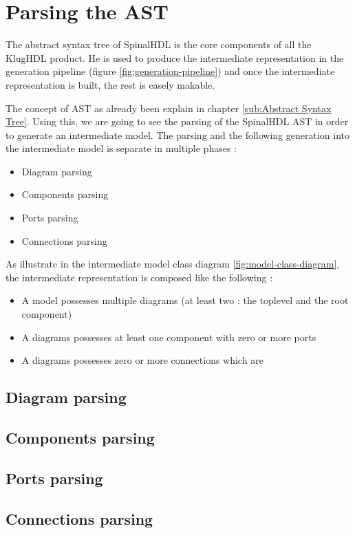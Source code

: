 \chapter{Parsing the AST}
\label{chap:parsing-ast}

The abstract syntax tree of SpinalHDL is the core components of all the KlugHDL
product. He is used to produce the intermediate representation in the generation
pipeline (figure \ref{fig:generation-pipeline}) and once the intermediate
representation is built, the rest is easely makable.

The concept of AST as already been explain in chapter \ref{sub:Abstract Syntax
  Tree}. Using this, we are going to see the parsing of the SpinalHDL AST in
order to generate an intermediate model. The parsing and the following
generation into the intermediate model is separate in multiple
phases :

\begin{itemize}
\item Diagram parsing
\item Components parsing
\item Ports parsing
\item Connections parsing
\end{itemize}

As illustrate in the intermediate model class diagram
\ref{fig:model-class-diagram}, the intermediate representation is composed like
the following :
\begin{itemize}
\item A model possesses multiple diagrams (at least two : the toplevel and the
  root component)
\item A diagrams possesses at least one component with zero or more ports
\item A diagrams possesses zero or more connections which are 
\end{itemize}

\section{Diagram parsing}
\label{sec:diagrams-parsing}

\section{Components parsing}
\label{sec:components-parsing}

\section{Ports parsing}
\label{sec:ports-parsing}

\section{Connections parsing}
\label{sec:connections-parsing}

